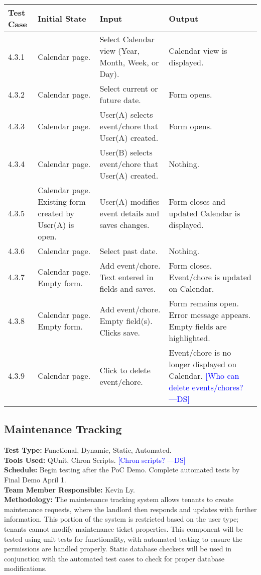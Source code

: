 \documentclass[12pt]{article}
\newcommand{\authornote}[3]{\textcolor{#1}{[#3 ---#2]}}
\newcommand{\authornote}[3]{}
\newcommand{\ds}[1]{\authornote{blue}{DS}{#1}}
\begin{document}
\begin{longtable}{|p{2cm}|p{3cm}|p{5cm}|p{5cm}|}
\hline
\textbf{Test Case}  & \textbf{Initial State} & \textbf{Input} & \textbf{Output} \\ \hline
4.3.1 & Calendar page. & Select Calendar view (Year, Month, Week, or Day). & Calendar view is displayed. \\ 
\hline
4.3.2 & Calendar page. & Select current or future date. & Form opens. \\ 
\hline
4.3.3 & Calendar page. & User(A) selects event/chore that User(A) created. & Form opens. \\ 
\hline
4.3.4 & Calendar page. & User(B) selects event/chore that User(A) created. & Nothing. \\ 
\hline
4.3.5 & Calendar page. Existing form created by User(A) is open. & User(A) modifies event details and saves changes. & Form closes and updated Calendar is displayed. \\ 
\hline
4.3.6 & Calendar page. & Select past date. & Nothing. \\ 
\hline
4.3.7 & Calendar page. Empty form. & Add event/chore. Text entered in fields and saves. & Form closes. Event/chore is updated on Calendar. \\ 
\hline
4.3.8 & Calendar page. Empty form. & Add event/chore. Empty field(s). Clicks save. & Form remains open. Error message appears. Empty fields are highlighted. \\
\hline
4.3.9 & Calendar page. & Click to delete event/chore. & Event/chore is no longer displayed on Calendar. \ds{Who can delete events/chores?} \\
\hline
\end{longtable}

\subsection{Maintenance Tracking}
\textbf{Test Type:} Functional, Dynamic, Static, Automated. \\
\textbf{Tools Used:} QUnit, Chron Scripts. \ds{Chron scripts?}\\
\textbf{Schedule:} Begin testing after the PoC Demo. Complete automated tests by Final Demo April 1. \\
\textbf{Team Member Responsible:} Kevin Ly. \\
\textbf{Methodology:} The maintenance tracking system allows tenants to create maintenance requests, where the landlord then responds and updates with further information. This portion of the system is restricted based on the user type; tenants cannot modify maintenance ticket properties. This component will be tested using unit tests for functionality, with automated testing to ensure the permissions are handled properly. Static database checkers will be used in conjunction with the automated test cases to check for proper database modifications.
\end{document}
